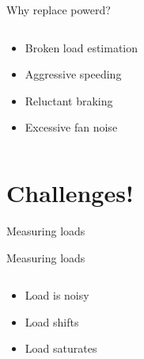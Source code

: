 \documentclass[aspectratio=169]{beamer}
\begin{document}
\begin{frame}{Why replace powerd?}
\begin{columns}[onlytextwidth]
\begin{column}{0.4\textwidth}
\begin{itemize}
\item<1-> Broken load estimation
\item<2-> Aggressive speeding
\item<3-> Reluctant braking
\item<4-> Excessive fan noise
\end{itemize}
\end{column}
\begin{column}{0.6\textwidth}
\begin{tikzpicture}[scale=.6]


\end{tikzpicture}
\end{column}
\end{columns}
\end{frame}

\section{Challenges!}

\begin{frame}{Measuring loads}
\centering
\begin{tikzpicture}

\end{tikzpicture}
\end{frame}

\begin{frame}{Measuring loads}
\begin{columns}[onlytextwidth]
\begin{column}{0.4\textwidth}
\begin{itemize}
\item<1-> Load is noisy
\item<2-> Load shifts
\item<3-> Load saturates
\end{itemize}
\end{column}
\begin{column}{0.6\textwidth}
\begin{tikzpicture}[scale=.6]

\end{tikzpicture}
\end{column}
\end{columns}
\end{frame}
\end{document}

